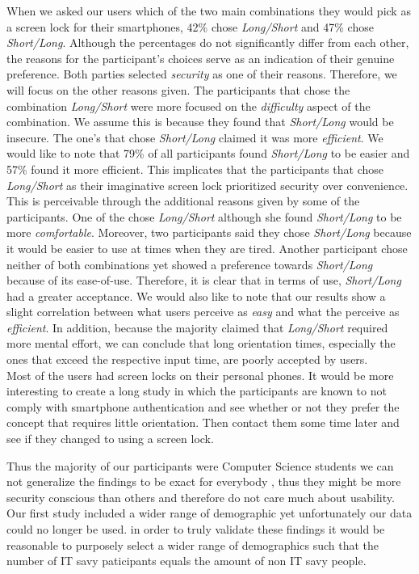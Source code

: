 When we asked our users which of the two main combinations they would pick as a screen lock for their smartphones, 42\% chose \textit{Long/Short} and 47\% chose \textit{Short/Long}. Although the percentages do not significantly differ from each other, the reasons for the participant's choices serve as an indication of their genuine preference. Both parties selected \textit{security} as one of their reasons.
Therefore, we will focus on the other reasons given. The participants that chose the combination \textit{Long/Short} were more focused on the \textit{difficulty} aspect of the combination. We assume this is because they found that \textit{Short/Long} would be insecure. The one's that chose \textit{Short/Long} claimed it was more \textit{efficient}. We would like to note that 79\% of all participants found \textit{Short/Long} to be easier and 57\% found it more efficient. This implicates that the participants that chose \textit{Long/Short} as their imaginative screen lock prioritized security over convenience. This is perceivable through the additional reasons given by some of the participants. One of the chose \textit{Long/Short} although she found \textit{Short/Long} to be more \textit{comfortable}. Moreover, two participants said they chose \textit{Short/Long} because it would be easier to use at times when they are tired. Another participant chose neither of both combinations yet showed a preference towards \textit{Short/Long} because of its ease-of-use. Therefore, it is clear that in terms of use, \textit{Short/Long} had a greater acceptance. We would also like to note that our results show a slight correlation between what users perceive as \textit{easy} and what the perceive as \textit{efficient}. In addition, because the majority claimed that \textit{Long/Short} required more mental effort, we can conclude that long orientation times, especially the ones that exceed the respective input time, are poorly accepted by users. \\







Most of the users had screen locks on their personal phones. It would be more interesting to create a long study in which the participants are known to not comply with smartphone authentication and see whether or not they prefer the concept that requires little orientation. Then contact them some time later and see if they changed to using a screen lock.


Thus the majority of our participants were Computer Science students we can not generalize the findings to be exact for everybody , thus they might be more security conscious than others and therefore do not care much about usability. Our first study included a wider range of demographic yet unfortunately our data could no longer be used. in order to truly validate these findings it would be reasonable to purposely select a wider range of demographics such that the number of IT savy paticipants equals the amount of non IT savy people.  \\


